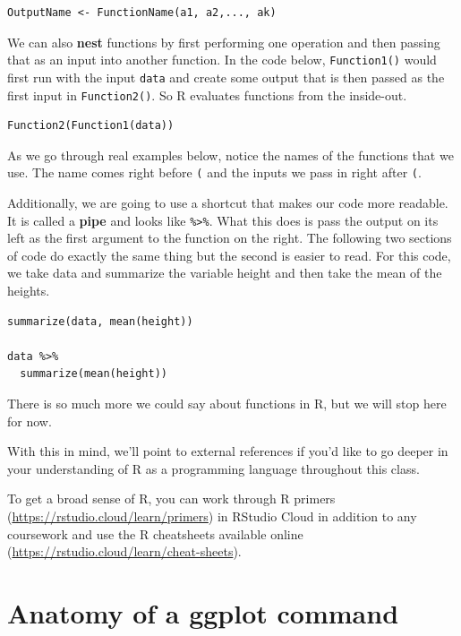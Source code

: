 \documentclass[
]{book}
\begin{document}
\begin{verbatim}
OutputName <- FunctionName(a1, a2,..., ak)
\end{verbatim}

We can also \textbf{nest} functions by first performing one operation and then passing that as an input into another function. In the code below, \texttt{Function1()} would first run with the input \texttt{data} and create some output that is then passed as the first input in \texttt{Function2()}. So R evaluates functions from the inside-out.

\begin{verbatim}
Function2(Function1(data))
\end{verbatim}

As we go through real examples below, notice the names of the functions that we use. The name comes right before \texttt{(} and the inputs we pass in right after \texttt{(}.

Additionally, we are going to use a shortcut that makes our code more readable. It is called a \textbf{pipe} and looks like \texttt{\%\textgreater{}\%}. What this does is pass the output on its left as the first argument to the function on the right. The following two sections of code do exactly the same thing but the second is easier to read. For this code, we take data and summarize the variable height and then take the mean of the heights.

\begin{verbatim}
summarize(data, mean(height))

data %>%
  summarize(mean(height))
\end{verbatim}

There is so much more we could say about functions in R, but we will stop here for now.

With this in mind, we'll point to external references if you'd like to go deeper in your understanding of R as a programming language throughout this class.

To get a broad sense of R, you can work through R primers (\url{https://rstudio.cloud/learn/primers}) in RStudio Cloud in addition to any coursework and use the R cheatsheets available online (\url{https://rstudio.cloud/learn/cheat-sheets}).

\hypertarget{anatomy-of-a-ggplot-command}{%
\section{Anatomy of a ggplot command}\label{anatomy-of-a-ggplot-command}}
\end{document}
